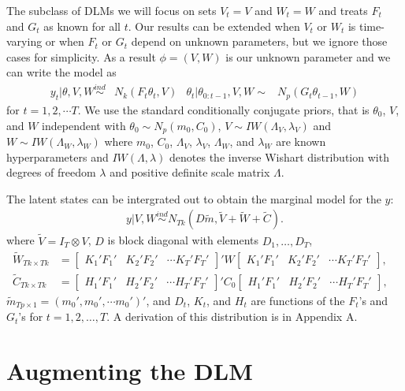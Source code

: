 \documentclass[12pt]{article}
\begin{document}
The subclass of DLMs we will focus on sets $V_t=V$ and $W_t=W$ and treats $F_{t}$ and $G_{t}$ as known for all $t$. Our results can be extended when $V_t$ or $W_t$ is time-varying or when $F_t$ or $G_t$ depend on unknown parameters, but we ignore those cases for simplicity. As a result $\phi=(V,W)$ is our unknown parameter and we can write the model as
\begin{align}
  y_t|\theta,V,W \stackrel{ind}{\sim} & N_k(F_t\theta_t,V) &
  \theta_t|\theta_{0:t-1},V,W  \sim & N_p(G_t\theta_{t-1},W) \label{dlmbotheqs}
\end{align}
for $t=1,2,\cdots T$. We use the standard conditionally conjugate priors, that is $\theta_0$, $V$, and $W$ independent with $\theta_0 \sim N_p(m_0, C_0)$, $V \sim IW(\Lambda_V, \lambda_V)$ and $W \sim IW(\Lambda_W, \lambda_W)$ where $m_0$, $C_0$, $\Lambda_V$, $\lambda_V$, $\Lambda_W$, and $\lambda_W$ are known hyperparameters and $IW(\Lambda, \lambda)$ denotes the inverse Wishart distribution with degrees of freedom $\lambda$ and positive definite scale matrix $\Lambda$.

The latent states can be intergrated out to obtain the marginal model for the $y$:
\begin{align}
  y|V,W \stackrel{ind}{\sim} N_{Tk}(D\tilde{m}, \tilde{V} + \tilde{W} + \tilde{C}). \label{margmodel}
\end{align}
where $\tilde{V}=I_T\otimes V$, $D$ is block diagonal with elements $D_1,\ldots,D_T$, 
\begin{align*}
\tilde{W}_{Tk\times Tk} &= \begin{bmatrix} K_1'F_1' & K_2'F_2' & \cdots K_T'F_T' \end{bmatrix}' W \begin{bmatrix} K_1'F_1' & K_2'F_2' & \cdots K_T'F_T' \end{bmatrix}, &\\
\tilde{C}_{Tk\times Tk} &= \begin{bmatrix} H_1'F_1' & H_2'F_2' & \cdots H_T'F_T' \end{bmatrix}' C_0 \begin{bmatrix} H_1'F_1' & H_2'F_2' & \cdots H_T'F_T' \end{bmatrix},&
\end{align*}
$\tilde{m}_{Tp\times 1} = (m_0', m_0', \cdots m_0')'$, and $D_t$, $K_t$, and $H_t$ are functions of the $F_t$'s and $G_t$'s for $t=1,2,\dots,T$. A derivation of this distribution is in Appendix A.



\section{Augmenting the DLM}\label{sec:DAs}
\end{document}
